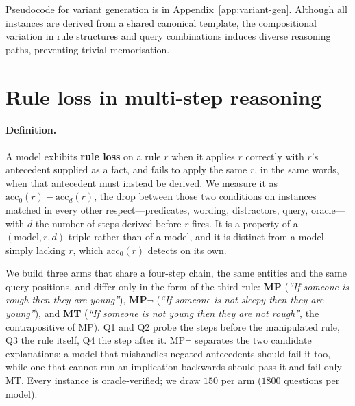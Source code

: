 \documentclass{article}
\begin{document}
Pseudocode for variant generation is in Appendix~\ref{app:variant-gen}. Although all instances are derived from a shared canonical template, the compositional variation in rule structures and query combinations induces diverse reasoning paths, preventing trivial memorisation.

\section{Rule loss in multi-step reasoning}
\label{sec:chain}

\paragraph{Definition.} A model exhibits \textbf{rule loss} on a rule $r$ when
it applies $r$ correctly with $r$'s antecedent supplied as a fact, and fails to
apply the same $r$, in the same words, when that antecedent must instead be
derived. We measure it as $\mathrm{acc}_{0}(r) - \mathrm{acc}_{d}(r)$, the drop
between those two conditions on instances matched in every other
respect---predicates, wording, distractors, query, oracle---with $d$ the number
of steps derived before $r$ fires. It is a property of a
$(\text{model}, r, d)$ triple rather than of a model, and it is distinct from a
model simply lacking $r$, which $\mathrm{acc}_{0}(r)$ detects on its own.

We build three arms that share a four-step chain, the same entities and the
same query positions, and differ only in the form of the third rule: \textbf{MP}
(\emph{``If someone is rough then they are young''}), \textbf{MP$\neg$}
(\emph{``If someone is not sleepy then they are young''}), and \textbf{MT}
(\emph{``If someone is not young then they are not rough''}, the contrapositive
of MP). Q1 and Q2 probe the steps before the manipulated rule, Q3 the rule
itself, Q4 the step after it. MP$\neg$ separates the two candidate
explanations: a model that mishandles negated antecedents should fail it too,
while one that cannot run an implication backwards should pass it and fail only
MT. Every instance is oracle-verified; we draw $150$ per arm ($1800$ questions
per model).
\end{document}
